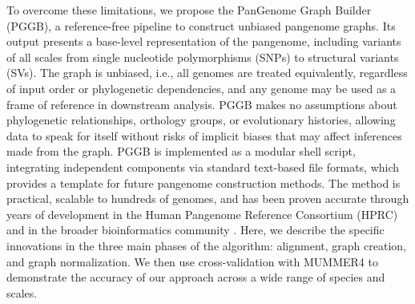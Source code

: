 \documentclass[pdflatex,mathphys]{jnl}%
\theoremstyle{thmstyleone}%
\theoremstyle{thmstyletwo}%
\theoremstyle{thmstylethree}%
\begin{document}
To overcome these limitations, we propose the PanGenome Graph Builder (PGGB), a reference-free pipeline to construct unbiased pangenome graphs.
Its output presents a base-level representation of the pangenome, including variants of all scales from single nucleotide polymorphisms (SNPs) to structural variants (SVs).
The graph is unbiased, i.e., all genomes are treated equivalently, regardless of input order or phylogenetic dependencies, and any genome may be used as a frame of reference in downstream analysis.
PGGB makes no assumptions about phylogenetic relationships, orthology groups, or evolutionary histories, allowing data to speak for itself without risks of implicit biases that may affect inferences made from the graph.
PGGB is implemented as a modular shell script, integrating independent components via standard text-based file formats, which provides a template for future pangenome construction methods.
The method is practical, scalable to hundreds of genomes, and has been proven accurate through years of development in the Human Pangenome Reference Consortium (HPRC) \cite{Liao_2023,Guarracino_2023} and in the broader bioinformatics community \cite{crysnanto2022comparison,zhang2022fast,Leonard_2022,Zhou_2022}.
Here, we describe the specific innovations in the three main phases of the algorithm: alignment, graph creation, and graph normalization.
We then use cross-validation with MUMMER4 \cite{Marcais_2018} to demonstrate the accuracy of our approach across a wide range of species and scales.
\end{document}
